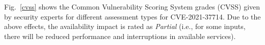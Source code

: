 



Fig.~\ref{cvss} shows the Common Vulnerability Scoring System grades
(CVSS) given by security experts for different assessment types
for CVE-2021-37714. Due to the above effects, the availability impact is rated as {\em Partial} (i.e., for some
inputs, there will be reduced performance and interruptions in
available services).



